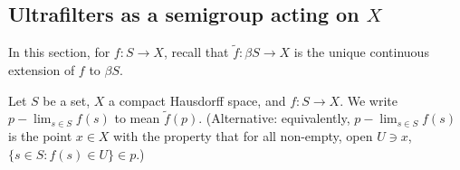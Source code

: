 



    

\subsection{Ultrafilters as a semigroup acting on $X$}



In this section, for $f: S \to X$, recall that $\tilde f: \beta S \to X$ is the unique continuous extension of $f$ to $\beta S$.

\begin{definition}[$p-\lim$]
\leanok{}
    Let $S$ be a set, $X$ a compact Hausdorff space, and $f: S \to X$.  We write $p-\lim_{s \in S} f(s)$ to mean $\tilde f (p)$.  (Alternative: equivalently, $p-\lim_{s \in S} f(s)$ is the point $x \in X$ with the property that for all non-empty, open $U \ni x$, $\{s \in S : f(s) \in U\} \in p$.)
\end{definition}

